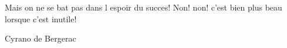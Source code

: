 \documentclass{ucbthesis}
\begin{document}




\epigraph{Mais on ne se bat pas dans l espoir du succes! Non! non! c'est bien plus beau lorsque c'est inutile!}{Cyrano de Bergerac}













\printbibliography
\end{document}
